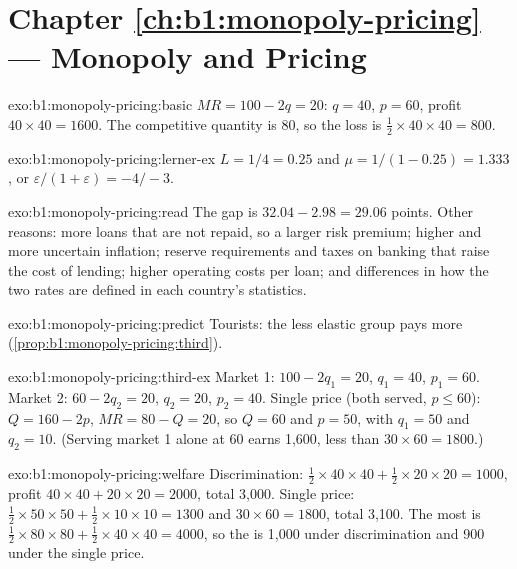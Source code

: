 \section*{Chapter \ref{ch:b1:monopoly-pricing} --- Monopoly and Pricing}

\begin{solution}{exo:b1:monopoly-pricing:basic}
$MR = 100 - 2q = 20$: $q = 40$, $p = 60$, profit $40 \times 40 = 1600$. The competitive
quantity is 80, so the loss is $\tfrac12 \times 40 \times 40 = 800$.
\end{solution}

\begin{solution}{exo:b1:monopoly-pricing:lerner-ex}
$L = 1/4 = 0.25$ and $\mu = 1/(1 - 0.25) = 1.333$, or $\varepsilon/(1 + \varepsilon) = -4/-3$.
\end{solution}

\begin{solution}{exo:b1:monopoly-pricing:read}
The gap is $32.04 - 2.98 = 29.06$ points. Other reasons: more loans that are not
repaid, so a larger risk premium; higher and more uncertain inflation;
reserve requirements and taxes on banking that raise the cost of lending;
higher operating costs per loan; and differences in how the two rates are
defined in each country's statistics.
\end{solution}

\begin{solution}{exo:b1:monopoly-pricing:predict}
Tourists: the less elastic group pays more
(\cref{prop:b1:monopoly-pricing:third}).
\end{solution}

\begin{solution}{exo:b1:monopoly-pricing:third-ex}
Market 1: $100 - 2q_1 = 20$, $q_1 = 40$, $p_1 = 60$. Market 2: $60 - 2q_2 = 20$, $q_2 = 20$,
$p_2 = 40$. Single price (both served, $p \le 60$): $Q = 160 - 2p$, $MR = 80 - Q = 20$, so $Q = 60$
and $p = 50$, with $q_1 = 50$ and $q_2 = 10$. (Serving market 1 alone at 60 earns 1,600,
less than $30 \times 60 = 1800$.)
\end{solution}

\begin{solution}{exo:b1:monopoly-pricing:welfare}
Discrimination:  $\tfrac12 \times 40 \times 40 + \tfrac12 \times 20 \times 20 = 1000$, profit
$40 \times 40 + 20 \times 20 = 2000$, total 3,000. Single price: $\tfrac12 \times 50 \times 50 + \tfrac12 \times 10 \times 10 = 1300$
and $30 \times 60 = 1800$, total 3,100. The most is $\tfrac12 \times 80 \times 80 + \tfrac12 \times 40 \times 40 = 4000$, so the
 is 1,000 under discrimination and 900 under the single price.
\end{solution}

